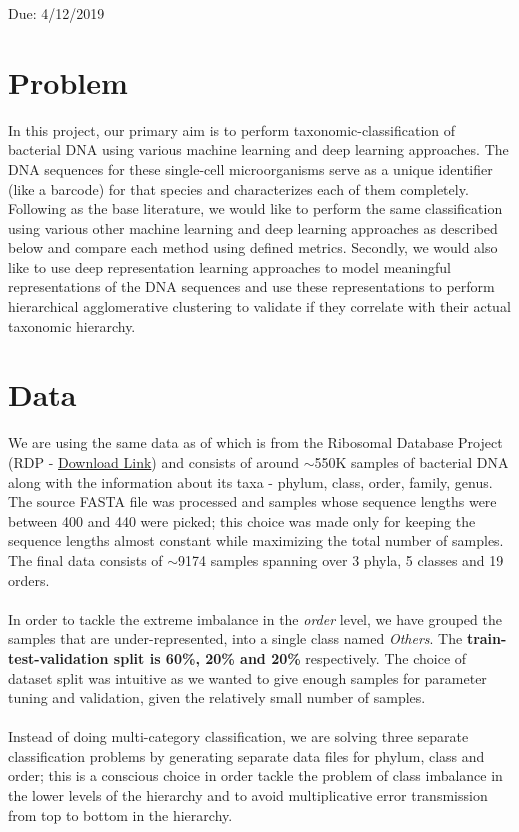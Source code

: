 \documentclass[12pt]{article}
\begin{document}
\maketitle

Due: 4/12/2019

\section{Problem}
In this project, our primary aim is to perform taxonomic-classification of bacterial DNA
using various machine learning and deep learning approaches. The DNA sequences for these single-cell microorganisms serve as a unique identifier (like a barcode) for that species and characterizes each of them completely. Following \cite{src_work} as the base literature, we would like to perform the same classification using various other machine learning and deep learning approaches as described below and compare each method using defined metrics. Secondly, we would also like to use deep representation learning approaches to model meaningful representations of the DNA sequences and use these representations to perform hierarchical agglomerative clustering to validate if they correlate with their actual taxonomic hierarchy.

\section{Data}
We are using the same data as of \cite{src_work} which is from the Ribosomal Database Project (RDP \cite{rdp} -
{\color{blue}\href{https://rdp.cme.msu.edu/download/current_Bacteria_unaligned.fa.gz}{Download Link}}) and consists of around $\sim$550K samples of bacterial DNA along with the information about its taxa - phylum, class, order, family, genus. The source FASTA file was processed and samples whose sequence lengths were between 400 and 440 were picked; this choice was made only for keeping the sequence lengths almost constant while maximizing the total number of samples. The final data consists of $\sim$9174 samples spanning over 3 phyla, 5 classes and 19 orders.
\\
\\
In order to tackle the extreme imbalance in the \textit{order} level, we have grouped the samples that are under-represented, into a single class named \textit{Others}. The \textbf{train-test-validation split is 60\%, 20\% and 20\%} respectively. The choice of dataset split was intuitive as we wanted to give enough samples for parameter tuning and validation, given the relatively small number of samples.
\\
\\
Instead of doing multi-category classification, we are solving three separate classification problems by generating separate data files for phylum, class and order; this is a conscious choice in order tackle the problem of class imbalance in the lower levels of the hierarchy and to avoid multiplicative error transmission from top to bottom in the hierarchy.
\end{document}
